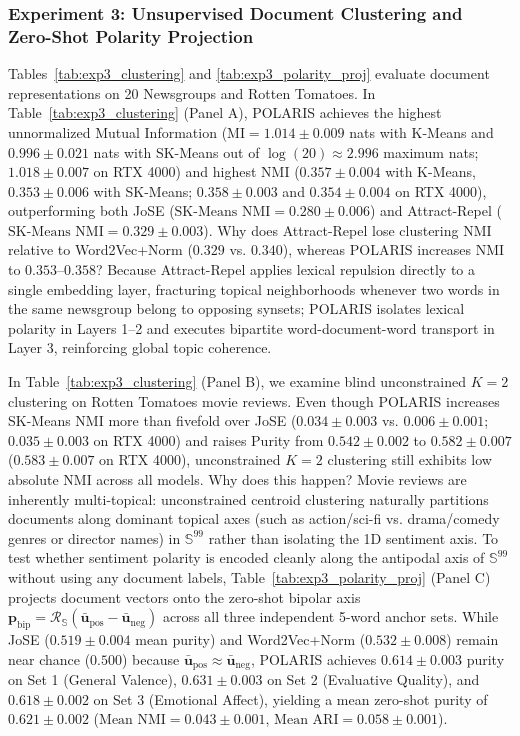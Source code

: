 \documentclass[journal]{IEEEtran}
\begin{document}
\subsubsection{Experiment 3: Unsupervised Document Clustering and Zero-Shot Polarity Projection}
Tables~\ref{tab:exp3_clustering} and \ref{tab:exp3_polarity_proj} evaluate document representations on 20 Newsgroups and Rotten Tomatoes. In Table~\ref{tab:exp3_clustering} (Panel A), POLARIS achieves the highest unnormalized Mutual Information ($\text{MI} = 1.014 \pm 0.009$ nats with K-Means and $0.996 \pm 0.021$ nats with SK-Means out of $\log(20) \approx 2.996$ maximum nats; $1.018 \pm 0.007$ on RTX 4000) and highest NMI ($0.357 \pm 0.004$ with K-Means, $0.353 \pm 0.006$ with SK-Means; $0.358 \pm 0.003$ and $0.354 \pm 0.004$ on RTX 4000), outperforming both JoSE ($\text{SK-Means NMI} = 0.280 \pm 0.006$) and Attract-Repel ($\text{SK-Means NMI} = 0.329 \pm 0.003$). Why does Attract-Repel lose clustering NMI relative to Word2Vec+Norm ($0.329$ vs. $0.340$), whereas POLARIS increases NMI to $0.353$--$0.358$? Because Attract-Repel applies lexical repulsion directly to a single embedding layer, fracturing topical neighborhoods whenever two words in the same newsgroup belong to opposing synsets; POLARIS isolates lexical polarity in Layers 1--2 and executes bipartite word-document-word transport in Layer 3, reinforcing global topic coherence.

In Table~\ref{tab:exp3_clustering} (Panel B), we examine blind unconstrained $K=2$ clustering on Rotten Tomatoes movie reviews. Even though POLARIS increases SK-Means NMI more than fivefold over JoSE ($0.034 \pm 0.003$ vs. $0.006 \pm 0.001$; $0.035 \pm 0.003$ on RTX 4000) and raises Purity from $0.542 \pm 0.002$ to $0.582 \pm 0.007$ ($0.583 \pm 0.007$ on RTX 4000), unconstrained $K=2$ clustering still exhibits low absolute NMI across all models. Why does this happen? Movie reviews are inherently multi-topical: unconstrained centroid clustering naturally partitions documents along dominant topical axes (such as action/sci-fi vs. drama/comedy genres or director names) in $\mathbb{S}^{99}$ rather than isolating the 1D sentiment axis. To test whether sentiment polarity is encoded cleanly along the antipodal axis of $\mathbb{S}^{99}$ without using any document labels, Table~\ref{tab:exp3_polarity_proj} (Panel C) projects document vectors onto the zero-shot bipolar axis $\mathbf{p}_{\text{bip}} = \mathcal{R}_{\mathbb{S}}(\bar{\mathbf{u}}_{\text{pos}} - \bar{\mathbf{u}}_{\text{neg}})$ across all three independent 5-word anchor sets. While JoSE ($0.519 \pm 0.004$ mean purity) and Word2Vec+Norm ($0.532 \pm 0.008$) remain near chance ($0.500$) because $\bar{\mathbf{u}}_{\text{pos}} \approx \bar{\mathbf{u}}_{\text{neg}}$, POLARIS achieves $0.614 \pm 0.003$ purity on Set 1 (General Valence), $0.631 \pm 0.003$ on Set 2 (Evaluative Quality), and $0.618 \pm 0.002$ on Set 3 (Emotional Affect), yielding a mean zero-shot purity of $0.621 \pm 0.002$ ($\text{Mean NMI} = 0.043 \pm 0.001$, $\text{Mean ARI} = 0.058 \pm 0.001$).
\end{document}
